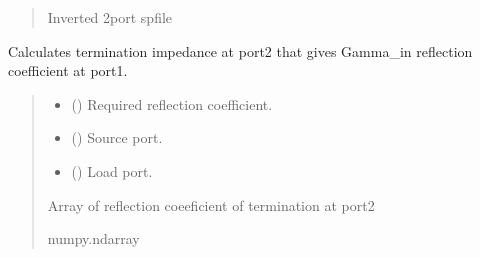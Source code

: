 \documentclass[letterpaper,10pt,english]{sphinxmanual}
\begin{document}
\begin{fulllineitems}
\begin{fulllineitems}
\begin{quote}
\begin{description}
\sphinxAtStartPar
Inverted 2\sphinxhyphen{}port spfile

\sphinxAtStartPar
{\hyperref[\detokenize{touchstone:touchstone.spfile}]{}}

\end{description}\end{quote}

\end{fulllineitems}


\begin{fulllineitems}
\label{\detokenize{touchstone:touchstone.spfile.load_impedance}}
\pysigstartsignatures
{}
\pysigstopsignatures
\sphinxAtStartPar
Calculates termination impedance at port2 that gives Gamma\_in reflection coefficient at port1.
\begin{quote}\begin{description}
\begin{itemize}
\item {}
\sphinxAtStartPar
{} (\sphinxstyleliteralemphasis{\sphinxupquote{,}}) \textendash{} Required reflection coefficient.

\item {}
\sphinxAtStartPar
{} () \textendash{} Source port.

\item {}
\sphinxAtStartPar
{} () \textendash{} Load port.

\end{itemize}

\sphinxAtStartPar
Array of reflection coeeficient of termination at port2

\sphinxAtStartPar
numpy.ndarray

\end{description}\end{quote}


\end{fulllineitems}
\end{fulllineitems}
\end{document}
